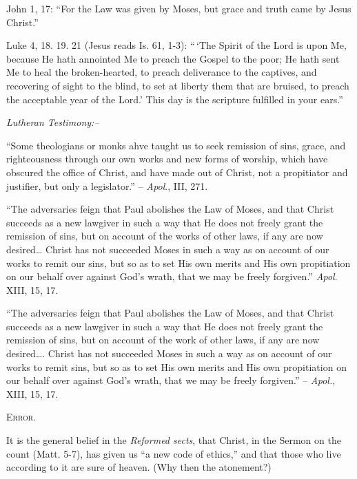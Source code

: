 \documentclass[
]{book}
\begin{document}
John 1, 17: ``For the Law was given by Moses, but grace and truth came by Jesus Christ.''

Luke 4, 18. 19. 21 (Jesus reads Is. 61, 1-3): ``\,`The Spirit of the Lord is upon Me, because He hath annointed Me to preach the Gospel to the poor; He hath sent Me to heal the broken-hearted, to preach deliverance to the captives, and recovering of sight to the blind, to set at liberty them that are bruised, to preach the acceptable year of the Lord.' This day is the scripture fulfilled in your ears.''

\begin{center}
\textsl{Lutheran Testimony:--}
\end{center}

``Some theologians or monks ahve taught us to seek remission of sins, grace, and righteousness through our own works and new forms of worship, which have obscured the office of Christ, and have made out of Christ, not a propitiator and justifier, but only a legislator.'' -- \emph{Apol}., III, 271.

``The adversaries feign that Paul abolishes the Law of Moses, and that Christ succeeds as a new lawgiver in such a way that He does not freely grant the remission of sins, but on account of the works of other laws, if any are now desired\ldots{} Christ has not succeeded Moses in such a way as on account of our works to remit our sins, but so as to set His own merits and His own propitiation on our behalf over against God's wrath, that we may be freely forgiven.'' \emph{Apol}. XIII, 15, 17.

``The adversaries feign that Paul abolishes the Law of Moses, and that Christ succeeds as a new lawgiver in such a way that He does not freely grant the remission of sins, but on account of the work of other laws, if any are now desired\ldots. Christ has not succeeded Moses in such a way as on account of our works to remit sins, but so as to set His own merits and His own propitiation on our behalf over against God's wrath, that we may be freely forgiven.'' -- \emph{Apol.}, XIII, 15, 17.

\begin{center}
\textsc{Error.}
\end{center}

It is the general belief in the \emph{Reformed sects}, that Christ, in the Sermon on the count (Matt. 5-7), has given us ``a new code of ethics,'' and that those who live according to it are sure of heaven. (Why then the atonement?)
\end{document}
